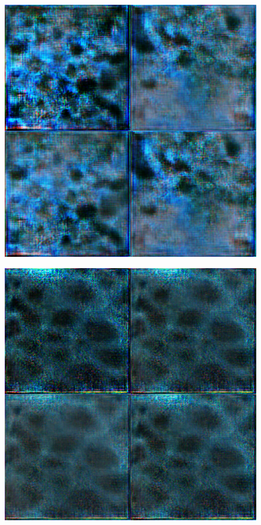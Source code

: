 \begin{figure}[H]
\begin{minipage}{0.24\columnwidth}
		\label{fig:}
	\end{minipage}
	\begin{minipage}{0.24\columnwidth}
		\centering
		\includegraphics[clip, width=\linewidth]{fig/generative_adversarial_nets/1619_0000}
		\label{fig:}
	\end{minipage}
	\begin{minipage}{0.24\columnwidth}
		\centering
		\includegraphics[clip, width=\linewidth]{fig/generative_adversarial_nets/2004_0000}

\end{minipage}
\end{figure}
